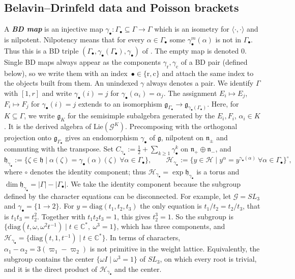 \documentclass[a4paper]{amsart}
\numberwithin{equation}{section}
\theoremstyle{definition}
\theoremstyle{remark}
\newcommand{\bbC}{\mathbb{C}}
\newcommand{\mfh}{\mathfrak{h}}
\newcommand{\mfg}{\mathfrak{g}}
\newcommand{\mfn}{\mathfrak{n}}
\newcommand{\mcG}{\mathcal{G}}
\newcommand{\mcH}{\mathcal{H}}
\newcommand{\Kil}[2]{\langle #1, #2\rangle}
\newcommand{\rr}{\mathrm{r}}
\newcommand{\cc}{\mathrm{c}}
\newcommand{\newword}[1]{\textbf{\emph{#1}}}
\begin{document}
\subsection{Belavin--Drinfeld data and Poisson brackets}
\label{sec: BD}
A \newword{BD map} is an injective map $\gamma_\bullet:\Gamma_\bullet\subseteq\Gamma\to\Gamma$ which is an isometry for $\Kil{\cdot}{\cdot}$ and is nilpotent.
Nilpotency means that for every $\alpha\in\Gamma_\bullet$ some $\gamma_\bullet^m(\alpha)$ is not in $\Gamma_\bullet$.
Thus this is a BD triple $(\Gamma_\bullet,\gamma_\bullet(\Gamma_\bullet),\gamma_\bullet)$ of \cite{BD82}.
The empty map is denoted $0$.
Single BD maps always appear as the components $\gamma_{\rr},\gamma_{\cc}$ of a BD pair (defined below), so we write them with an index~$\bullet\in\{\rr,\cc\}$ and attach the same index to the objects built from them.
An unindexed $\gamma$ always denotes a pair.
We identify $\Gamma$ with $[1,r]$ and write $\gamma_\bullet(i)=j$ for $\gamma_\bullet(\alpha_i)=\alpha_j$.
The assignment $E_i\mapsto E_j$, $F_i\mapsto F_j$ for $\gamma_\bullet(i)=j$ extends to an isomorphism $\mfg_{\Gamma_\bullet}\to\mfg_{\gamma_\bullet(\Gamma_\bullet)}$.
Here, for $K\subseteq\Gamma$, we write $\mfg_K$ for the semisimple subalgebra generated by the $E_i,F_i$, $\alpha_i\in K$.
It is the derived algebra of $\mathrm{Lie}(\mcG^K)$.
Precomposing with the orthogonal projection onto $\mfg_{\Gamma_\bullet}$ gives an endomorphism $\gamma_\bullet$ of $\mfg$, nilpotent on $\mfn_\pm$ and commuting with the transpose.
Set $C_{\gamma_\bullet}:=\frac12+\sum_{k\ge1}\gamma_\bullet^k$ on $\mfn_+\oplus\mfn_-$, and
\[
  \mfh_{\gamma_\bullet}:=\{\zeta\in\mfh\mid\alpha(\zeta)=\gamma_\bullet(\alpha)(\zeta)\ \forall\alpha\in\Gamma_\bullet\},
  \qquad
  \mcH_{\gamma_\bullet}:=\{y\in\mcH\mid y^\alpha=y^{\gamma_\bullet(\alpha)}\ \forall\alpha\in\Gamma_\bullet\}^{\circ},
\]
where $\circ$ denotes the identity component; thus $\mcH_{\gamma_\bullet}=\exp\mfh_{\gamma_\bullet}$ is a torus and $\dim\mfh_{\gamma_\bullet}=|\Gamma|-|\Gamma_\bullet|$.
We take the identity component because the subgroup defined by the character equations can be disconnected.
For example, let $\mcG=SL_3$ and $\gamma_\bullet=\{1\to2\}$.
For $y=\mathrm{diag}(t_1,t_2,t_3)$ the only equation is $t_1/t_2=t_2/t_3$, that is $t_1t_3=t_2^2$.
Together with $t_1t_2t_3=1$, this gives $t_2^3=1$.
So the subgroup is~$\{\mathrm{diag}(t,\omega,\omega^2t^{-1})\mid t\in\bbC^*,\ \omega^3=1\}$, which has three components, and $\mcH_{\gamma_\bullet}=\{\mathrm{diag}(t,1,t^{-1})\mid t\in\bbC^*\}$.
In terms of characters, $\alpha_1-\alpha_2=3(\varpi_1-\varpi_2)$ is not primitive in the weight lattice.
Equivalently, the subgroup contains the center $\{\omega I\mid\omega^3=1\}$ of $SL_3$, on which every root is trivial, and it is the direct product of $\mcH_{\gamma_\bullet}$ and the center.
\end{document}

